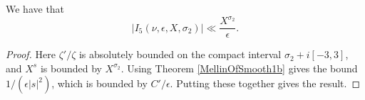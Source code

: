 \begin{lemma}[I5Bound]
\label{I5Bound}
\leanok
We have that
  $$
  \left|I_5(\nu,\epsilon,X,\sigma_2)\right|\ll\frac{X^{\sigma_2}}{\epsilon}.
  $$
\end{lemma}
\begin{proof}
\leanok
Here $\zeta'/\zeta$ is absolutely bounded on the compact interval $\sigma_2 + i [-3,3]$, and
  $X^s$ is bounded by $X^{\sigma_2}$. Using Theorem \ref{MellinOfSmooth1b} gives the bound
  $1/(\epsilon |s|^2)$, which is bounded by $C'/\epsilon$. Putting these together gives the result.
\end{proof}
